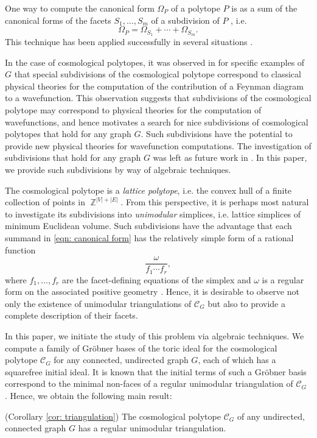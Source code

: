 \documentclass[11pt]{article}
\theoremstyle{definition}
\numberwithin{equation}{section}
\DeclareMathOperator{\ZZ}{\mathbb{Z}}
\begin{document}
One way to compute the canonical form $\Omega_P$ of a polytope $P$ is as a sum of the canonical forms of the facets $S_1,\ldots, S_m$ of a subdivision of $P$ \cite{lam2022invitation}, i.e.
\begin{equation}
    \label{eqn: canonical form}
    \Omega_P = \Omega_{S_1} + \cdots + \Omega_{S_m}. 
\end{equation}
This technique has been applied successfully in several situations \cite{benincasa2022physical,galashin2020parity,herrmann2021positive,kojima2020sign,mohammadi2021triangulations}.  

In the case of cosmological polytopes, it was observed in \cite{arkani2017cosmological} for specific examples of $G$ that special subdivisions of the cosmological polytope correspond to classical physical theories for the computation of the contribution of a Feynman diagram to a wavefunction.
This observation suggests that subdivisions of the cosmological polytope may correspond to physical theories for the computation of wavefunctions, and hence motivates a search for nice subdivisions of cosmological polytopes that hold for any graph $G$.  
Such subdivisions have the potential to provide new physical theories for wavefunction computations. 
The investigation of subdivisions that hold for any graph $G$ was left as future work in \cite{arkani2017cosmological}.
In this paper, we provide such subdivisions by way of algebraic techniques.

The cosmological polytope is a \emph{lattice polytope}, i.e. the convex hull of a finite collection of points in $\ZZ^{|V|+|E|}$. 
From this perspective, it is perhaps most natural to investigate its subdivisions into \emph{unimodular} simplices, i.e. lattice simplices of minimum Euclidean volume. 
Such subdivisions have the advantage that each summand in \eqref{eqn: canonical form} has the relatively simple form of a rational function
\begin{equation}
\label{eqn: canonical form formula}
    \frac{\omega}{f_1\cdots f_r},
\end{equation}
where $f_1,\ldots, f_r$ are the facet-defining equations of the simplex and $\omega$ is a regular form on the associated positive geometry \cite{arkani2015positive}. 
Hence, it is desirable to observe not only the existence of unimodular triangulations of $\mathcal{C}_G$ but also to provide a complete description of their facets. 

In this paper, we initiate the study of this problem via algebraic techniques. 
We compute a family of Gr\"obner bases of the toric ideal for the cosmological polytope $\mathcal{C}_G$ for any connected, undirected graph $G$, each of which has a squarefree initial ideal. 
It is known that the initial terms of such a Gr\"obner basis correspond to the minimal non-faces of a regular unimodular triangulation of $\mathcal{C}_G$ \cite{sturmfels1996grobner}. 
Hence, we obtain the following main result:
\begin{thmx} (Corollary \ref{cor: triangulation})
    \label{thm: main}
    The cosmological polytope $\mathcal{C}_G$ of any undirected, connected graph $G$ has a regular unimodular triangulation. 
\end{thmx}
\end{document}
